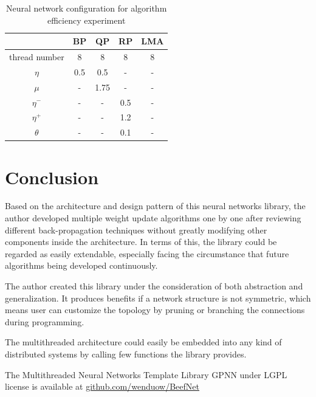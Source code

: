 \documentclass[procedia]{easychair}
\begin{document}
\begin{table}[htp]
    \centering
    \caption{Neural network configuration for algorithm efficiency experiment}
    \begin{tabular}{ c c c c c }
        \hline \hline
        & BP & QP & RP & LMA \\
        \hline
        thread number & 8 & 8 & 8 & 8 \\
        $\eta$ & 0.5 & 0.5 & - & - \\
        $\mu$ & - & 1.75 & - & - \\
        $\eta ^ -$ & - & - & 0.5 & - \\
        $\eta ^ +$ & - & - & 1.2 & - \\
        $\theta$ & - & - & 0.1 & - \\
        \hline \hline
    \end{tabular}
    \label{table:config_algorithm_efficiency}
\end{table}


\section{Conclusion}

Based on the architecture and design pattern of this neural networks library, the author developed multiple weight update algorithms one by one after reviewing different back-propagation techniques without greatly modifying other components inside the architecture.  In terms of this, the library could be regarded as easily extendable, especially facing the circumstance that future algorithms being developed continuously.

The author created this library under the consideration of both abstraction and generalization.  It produces benefits if a network structure is not symmetric, which means user can customize the topology by pruning or branching the connections during programming.

The multithreaded architecture could easily be embedded into any kind of distributed systems by calling few functions the library provides.

The Multithreaded Neural Networks Template Library GPNN under LGPL license is available at
\url{github.com/wenduow/BeefNet}

\end{document}
